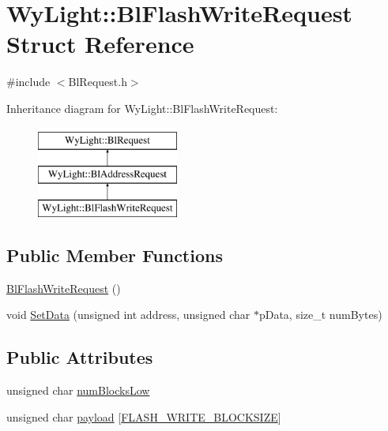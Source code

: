\hypertarget{struct_wy_light_1_1_bl_flash_write_request}{\section{Wy\-Light\-:\-:Bl\-Flash\-Write\-Request Struct Reference}
\label{struct_wy_light_1_1_bl_flash_write_request}
}


{\ttfamily \#include $<$Bl\-Request.\-h$>$}

Inheritance diagram for Wy\-Light\-:\-:Bl\-Flash\-Write\-Request\-:\begin{figure}[H]
\begin{center}
\leavevmode
\includegraphics[height=3.000000cm]{struct_wy_light_1_1_bl_flash_write_request}
\end{center}
\end{figure}
\subsection*{Public Member Functions}
\begin{DoxyCompactItemize}
\item 
\hyperlink{struct_wy_light_1_1_bl_flash_write_request_a00cecca6b19636cd189ee778ed5a7c41}{Bl\-Flash\-Write\-Request} ()
\item 
void \hyperlink{struct_wy_light_1_1_bl_flash_write_request_a7ad0fd6001817041996e9014d12e3334}{Set\-Data} (unsigned int address, unsigned char $\ast$p\-Data, size\-\_\-t num\-Bytes)
\end{DoxyCompactItemize}
\subsection*{Public Attributes}
\begin{DoxyCompactItemize}
\item 
unsigned char \hyperlink{struct_wy_light_1_1_bl_flash_write_request_a5a505e0a8efd8266cf248251a6f16d95}{num\-Blocks\-Low}
\item 
unsigned char \hyperlink{struct_wy_light_1_1_bl_flash_write_request_a79a8eab1d1d25b3acd1639e31c70539f}{payload} \mbox{[}\hyperlink{_bl_request_8h_ae93d0b04d7bc152e72713dc07fcc1e9f}{F\-L\-A\-S\-H\-\_\-\-W\-R\-I\-T\-E\-\_\-\-B\-L\-O\-C\-K\-S\-I\-Z\-E}\mbox{]}
\end{DoxyCompactItemize}


